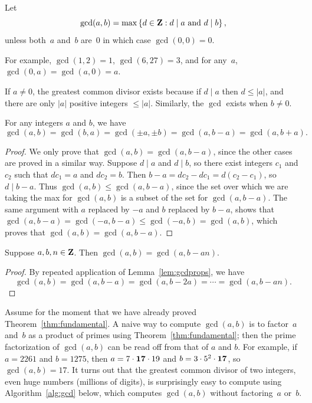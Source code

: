 \begin{definition}
Let
$$
  \gcd(a,b)=\max\left\{d\in \mathbf{Z} : d \mid a\text{ and } d\mid b\right\},
$$
unless both~$a$ and~$b$ are~$0$ in which case
$\gcd(0,0)=0$.
\end{definition}
For example,
$\gcd(1,2)=1$,
$\gcd(6,27)=3$, and
for any~$a$,
$\gcd(0,a)=\gcd(a,0)=a$.

If $a\neq 0$, the greatest common divisor exists because if $d\mid a$
then $d\leq |a|$, and there are only $|a|$ positive integers $\leq |a|$.
Similarly, the $\gcd$ exists when $b\neq 0$.

\begin{lemma}\label{lem:gcdprops}
For any integers $a$ and $b$, we have
$$
   \gcd(a,b)= \gcd(b,a) = \gcd(\pm a, \pm b) = \gcd(a,b-a) = \gcd(a,b+a).
$$
\end{lemma}
\begin{proof}
  We only prove that $\gcd(a,b) = \gcd(a,b-a)$, since the other cases
are proved in a similar way. Suppose $d\mid a$ and
  $d\mid b$, so there exist integers $c_1$ and $c_2$ such that $dc_1 =
  a$ and $dc_2 = b$.  Then $b - a = dc_2 - dc_1 = d(c_2-c_1)$, so
  $d\mid b-a$.  Thus $\gcd(a,b)\leq \gcd(a,b-a)$, since the set over
  which we are taking the max for $\gcd(a,b)$ is a subset of the set
  for $\gcd(a,b-a)$.  The same argument with $a$ replaced by $-a$
  and $b$ replaced by $b-a$, shows that $\gcd(a,b-a)=\gcd(-a,b-a)\leq
  \gcd(-a,b)=\gcd(a,b)$, which proves that $\gcd(a,b)=\gcd(a,b-a)$.
\end{proof}

\begin{lemma}\label{lem:gcdprops2}
Suppose $a,b,n\in\mathbf{Z}$.  Then
$\gcd(a,b) = \gcd(a,b-an)$.
\end{lemma}
\begin{proof}
By repeated application of Lemma~\ref{lem:gcdprops}, we have
$$
  \gcd(a,b) = \gcd(a,b-a) = \gcd(a,b-2a) = \cdots = \gcd(a,b-an).
$$
\end{proof}

Assume for the moment that we have already proved
Theorem~\ref{thm:fundamental}.  A naive way to compute
$\gcd(a,b)$ is to factor~$a$ and~$b$ as a product of primes using
Theorem~\ref{thm:fundamental}; then the prime factorization of
$\gcd(a,b)$ can be read off from that of $a$ and $b$.  For example, if
$a=2261$ and $b=1275$, then $a=7\cdot {\bf 17}\cdot 19$ and $b=3\cdot
5^2\cdot {\bf 17}$, so $\gcd(a,b) = 17$.  It turns out that the
greatest common divisor of two integers, even huge numbers (millions
of digits), is surprisingly easy to compute using
Algorithm~\ref{alg:gcd} below, which computes $\gcd(a,b)$ without
factoring~$a$ or~$b$.  

